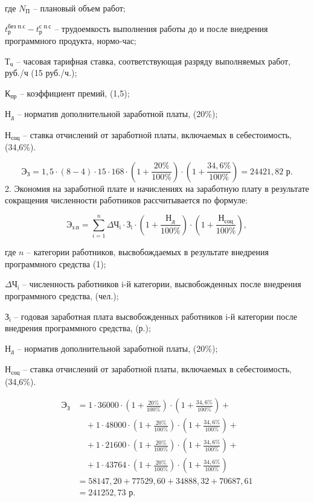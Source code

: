 где $N_{\text{П}}$ -- плановый объем работ;

$t^{\text{без п.с}}_{\text{р}}-t^{\text{с п.с}}_{\text{р}}$ -- трудоемкость выполнения работы до и после внедрения программного продукта, нормо-час;

$\text{Т}_{\text{ч}}$ -- часовая тарифная ставка, соответствующая разряду выполняемых работ, руб./ч (15 руб./ч.);

$\text{К}_{\text{пр}}$ -- коэффициент премий, (1,5);

$\text{Н}_{\text{д}}$ -- норматив дополнительной заработной платы, (20\%);

$\text{Н}_{\text{соц}}$ -- ставка отчислений от заработной платы, включаемых в себестоимость, (34,6\%).

$$
	\text{Э}_{\text{З}} = 1,5 \cdot (8-4)\cdot 15\cdot 168 \cdot  (1+\frac{20\%}{100\%})\cdot (1+\frac{34,6\%}{100\%}) =  24421,82 \text{ р}.

$$
2. Экономия на заработной плате и начислениях на заработную плату в результате сокращения численности работников рассчитывается по формуле:

\begin{equation}
\text{Э}_{\text{з.п}} = \sum_{i=1}^{n}{\text{$\Delta$Ч}_{\text{i}}\cdot \text{З}_{\text{i}}\cdot  (1+\frac{\text{Н}_{\text{д}}}{100\%})\cdot (1+\frac{\text{Н}_{\text{соц}}}{100\%})},
\end{equation}

где $n$ -- категории работников, высвобождаемых в результате внедрения
программного средства (1);

$\text{$\Delta$Ч}_{\text{i}}$ -- численность работников i-й категории, высвобожденных после
внедрения программного средства, (чел.);

$\text{З}_{\text{i}}$ -- годовая заработная плата высвобожденных работников i-й категории после внедрения программного средства, (р.);

$\text{Н}_{\text{д}}$ -- норматив дополнительной заработной платы, (20\%);

$\text{Н}_{\text{соц}}$ -- ставка отчислений от заработной платы, включаемых в себестоимость, (34,6\%).

\begin{align*}
	\text{Э}_{\text{З}} & = 1 \cdot 36000 \cdot \left(1 + \frac{20\%}{100\%}\right) \cdot \left(1 + \frac{34,6\%}{100\%}\right) +       \\
	                    & \quad + 1 \cdot 48000 \cdot \left(1 + \frac{20\%}{100\%}\right) \cdot \left(1 + \frac{34,6\%}{100\%}\right) + \\
	                    & \quad + 1 \cdot 21600 \cdot \left(1 + \frac{20\%}{100\%}\right) \cdot \left(1 + \frac{34,6\%}{100\%}\right) + \\
	                    & \quad + 1 \cdot 43764 \cdot \left(1 + \frac{20\%}{100\%}\right) \cdot \left(1 + \frac{34,6\%}{100\%}\right)   \\
	                    & = 58147,20 + 77529,60 + 34888,32 + 70687,61                                                                   \\
	                    & = 241252,73 \text{ р}.

\end{align*}

